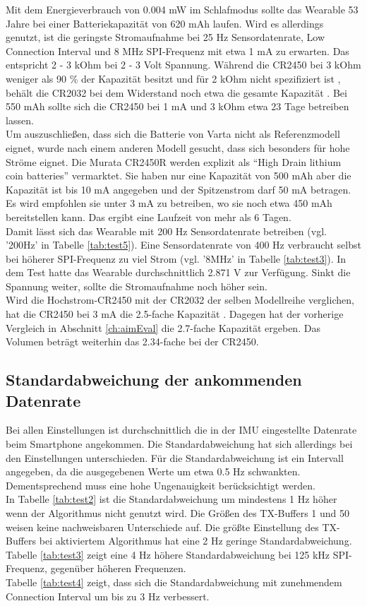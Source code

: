 Mit dem Energieverbrauch von 0.004 mW im Schlafmodus sollte das Wearable 53 Jahre bei einer Batteriekapazität von 620 mAh laufen.
Wird es allerdings genutzt, ist die geringste Stromaufnahme bei 25 Hz Sensordatenrate, Low Connection Interval und 8 MHz SPI-Frequenz mit etwa 1 mA zu erwarten.
Das entspricht 2 - 3 kOhm bei 2 - 3 Volt Spannung.
Während die CR2450 bei 3 kOhm weniger als 90 \% der Kapazität besitzt und für 2 kOhm nicht spezifiziert ist \cite{datasheet_ds6450}, behält die CR2032 bei dem Widerstand noch etwa die gesamte Kapazität \cite{datasheet_ds6032}.
Bei 550 mAh sollte sich die CR2450 bei 1 mA und 3 kOhm etwa 23 Tage betreiben lassen.\\
Um auszuschließen, dass sich die Batterie von Varta nicht als Referenzmodell eignet, wurde nach einem anderen Modell gesucht, dass sich besonders für hohe Ströme eignet.
Die Murata CR2450R werden explizit als ``High Drain lithium coin batteries'' \cite{site_murataCr2450r} vermarktet.
Sie haben nur eine Kapazität von 500 mAh aber die Kapazität ist bis 10 mA angegeben und der Spitzenstrom darf 50 mA betragen.
Es wird empfohlen sie unter 3 mA zu betreiben, wo sie noch etwa 450 mAh bereitstellen kann.
Das ergibt eine Laufzeit von mehr als 6 Tagen. \cite{site_murataCr2450r}\\
Damit lässt sich das Wearable mit 200 Hz Sensordatenrate betreiben (vgl. '200Hz' in Tabelle \ref{tab:test5}).
Eine Sensordatenrate von 400 Hz verbraucht selbst bei höherer SPI-Frequenz zu viel Strom (vgl. '8MHz' in Tabelle \ref{tab:test3}).
In dem Test hatte das Wearable durchschnittlich 2.871 V zur Verfügung.
Sinkt die Spannung weiter, sollte die Stromaufnahme noch höher sein.\\
Wird die Hochstrom-CR2450 mit der CR2032 der selben Modellreihe verglichen, hat die CR2450 bei 3 mA die 2.5-fache Kapazität \cite{site_murataCr2032r}.
Dagegen hat der vorherige Vergleich in Abschnitt \ref{ch:aimEval} die 2.7-fache Kapazität ergeben.
Das Volumen beträgt weiterhin das 2.34-fache bei der CR2450.

\subsection{Standardabweichung der ankommenden Datenrate}
Bei allen Einstellungen ist durchschnittlich die in der IMU eingestellte Datenrate beim Smartphone angekommen.
Die Standardabweichung hat sich allerdings bei den Einstellungen unterschieden.
Für die Standardabweichung ist ein Intervall angegeben, da die ausgegebenen Werte um etwa 0.5 Hz schwankten.
Dementsprechend muss eine hohe Ungenauigkeit berücksichtigt werden.\\
In Tabelle \ref{tab:test2} ist die Standardabweichung um mindestens 1 Hz höher wenn der Algorithmus nicht genutzt wird.
Die Größen des TX-Buffers 1 und 50 weisen keine nachweisbaren Unterschiede auf.
Die größte Einstellung des TX-Buffers bei aktiviertem Algorithmus hat eine 2 Hz geringe Standardabweichung.\\
Tabelle \ref{tab:test3} zeigt eine 4 Hz höhere Standardabweichung bei 125 kHz SPI-Frequenz, gegenüber höheren Frequenzen.\\
Tabelle \ref{tab:test4} zeigt, dass sich die Standardabweichung mit zunehmendem Connection Interval um bis zu 3 Hz verbessert.
